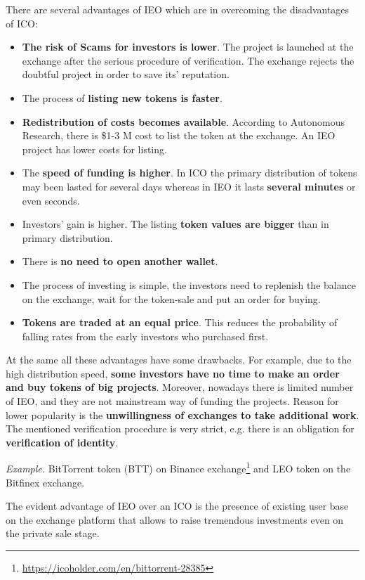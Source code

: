 There are several advantages of IEO which are in overcoming the disadvantages of ICO:
\begin{itemize}
\item \textbf{The risk of Scams for investors is lower}. The project is launched at the exchange after the serious procedure of verification. The exchange rejects the doubtful project in order to save its' reputation.
\item The process of \textbf{listing new tokens is faster}.
\item \textbf{Redistribution of costs becomes available}. According to Autonomous Research, there is \$1-3 M cost to list the token at the exchange. An IEO project has lower costs for listing.
\item The \textbf{speed of funding is higher}. In ICO the primary distribution of tokens may been lasted for several days whereas in IEO it lasts \textbf{several minutes} or even seconds.
\item Investors' gain is higher. The listing \textbf{token values are bigger} than in primary distribution.
\item There is \textbf{no need to open another wallet}.
\item The process of investing is simple, the investors need to replenish the balance on the exchange, wait for the token-sale and put an order for buying.
\item \textbf{Tokens are traded at an equal price}. This reduces the probability of falling rates from the early investors who purchased first.
\end{itemize}

At the same all these advantages have some drawbacks. For example, due to the high distribution speed, \textbf{some investors have no time to make an order and buy tokens of big projects}. Moreover, nowadays there is limited number of IEO, and they are not mainstream way of funding the projects. Reason for lower popularity is the \textbf{unwillingness of exchanges to take additional work}. The mentioned verification procedure is very strict, e.g. there is an obligation for \textbf{verification of identity}.

\emph{Example.} BitTorrent token (BTT) on Binance exchange\footnote{\url{https://icoholder.com/en/bittorrent-28385}} and LEO token on the Bitfinex exchange.

The evident advantage of IEO over an ICO is the presence of existing user base on the exchange platform that allows to raise tremendous investments even on the private sale stage.

